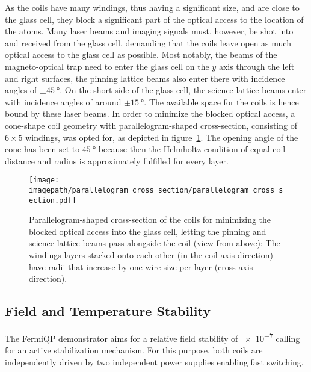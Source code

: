 As the coils have many windings, thus having a significant size, and are close to the glass cell, they block a significant part of the optical access to the location of the atoms. Many laser beams and imaging signals must, however, be shot into and received from the glass cell, demanding that the coils leave open as much optical access to the glass cell as possible. Most notably, the beams of the magneto-optical trap need to enter the glass cell on the $y$ axis through the left and right surfaces, the pinning lattice beams also enter there with incidence angles of $\pm \SI{45}{\degree}$. On the short side of the glass cell, the science lattice beams enter with incidence angles of around $\pm \SI{15}{\degree}$. The available space for the coils is hence bound by these laser beams. In order to minimize the blocked optical access, a cone-shape coil geometry with parallelogram-shaped cross-section, consisting of $6 \times 5$ windings, was opted for, as depicted in figure~\ref{fig:parallelogram_cross_section}. The opening angle of the cone has been set to $\SI{45}{\degree}$ because then the Helmholtz condition of equal coil distance and radius is approximately fulfilled for every layer.
\begin{figure}
    \centering
    \texttt{[image: \\imagepath/parallelogram\_cross\_section/parallelogram\_cross\_section.pdf]}
    \caption{Parallelogram-shaped cross-section of the coils for minimizing the blocked optical access into the glass cell, letting the pinning and science lattice beams pass alongside the coil (view from above): The windings layers stacked onto each other (in the coil axis direction) have radii that increase by one wire size per layer (cross-axis direction).}
    \label{fig:parallelogram_cross_section}
\end{figure}


\subsection*{Field and Temperature Stability}
The FermiQP demonstrator aims for a relative field stability of \SI{e-7}{} calling for an active stabilization mechanism. For this purpose, both coils are independently driven by two independent power supplies enabling fast switching.

